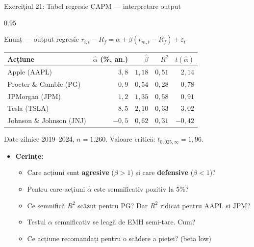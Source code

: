\documentclass[9pt, aspectratio=169, t]{beamer}
\begin{document}
\begin{frame}[shrink=25]{Exercițiul 21: Tabel regresie CAPM --- interpretare output}
\begin{cminipage}{0.95\textwidth}
\begin{block}{Enunț --- output regresie $r_{i,t} - R_f = \alpha + \beta(r_{m,t} - R_f) + \varepsilon_t$}
\small
\renewcommand{\arraystretch}{1.2}
\begin{center}
\begin{tabular}{lrrrr}
\toprule
\textbf{Acțiune} & $\hat\alpha$ (\%, an.) & $\hat\beta$ & $R^2$ & $t(\hat\alpha)$ \\
\midrule
Apple (AAPL) & $3{,}8$ & $1{,}18$ & $0{,}51$ & $2{,}14$ \\
Procter \& Gamble (PG) & $0{,}9$ & $0{,}54$ & $0{,}28$ & $0{,}78$ \\
JPMorgan (JPM) & $1{,}2$ & $1{,}35$ & $0{,}58$ & $0{,}91$ \\
Tesla (TSLA) & $8{,}5$ & $2{,}10$ & $0{,}33$ & $3{,}02$ \\
Johnson \& Johnson (JNJ) & $-0{,}5$ & $0{,}62$ & $0{,}31$ & $-0{,}42$ \\
\bottomrule
\end{tabular}
\end{center}
Date zilnice 2019--2024, $n = 1.260$. Valoare critică: $t_{0{,}025, \infty} = 1{,}96$.
\end{block}
\begin{itemize}\setlength{\itemsep}{0pt}
    \item \textbf{Cerințe:}
    \begin{itemize}\setlength{\itemsep}{0pt}
        \item Care acțiuni sunt \textbf{agresive} ($\beta > 1$) și care \textbf{defensive} ($\beta < 1$)?
        \item Pentru care acțiuni $\hat\alpha$ este semnificativ pozitiv la 5\%?
        \item Ce semnifică $R^2$ scăzut pentru PG? Dar $R^2$ ridicat pentru AAPL și JPM?
        \item Testul $\alpha$ semnificativ se leagă de EMH semi-tare. Cum?
        \item Ce acțiune recomandați pentru o scădere a pieței? (beta low)
    \end{itemize}
\end{itemize}
\end{cminipage}
\end{frame}
\end{document}
